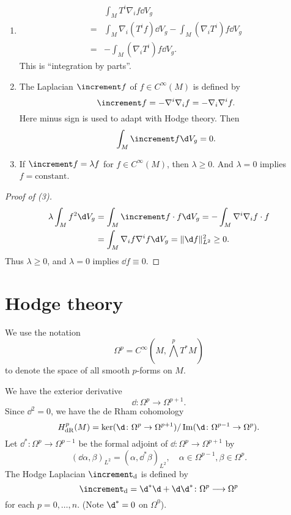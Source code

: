 \documentclass[12pt]{article}
\begin{document}
\begin{application}\hfill
\begin{enumerate}[(1)]
\item \begin{align*}
    &\int_{M}T^i \nabla_i f\dd{V_g} \\
    =&\int_{M}\nabla_i (T^i f)\dd{V_g}-\int_{M}(\nabla_i T^i)f\dd{V_g} \\
    =&-\int_{M}(\nabla_i T^i)f \dd{V_g}
  .\end{align*}
  This is ``integration by parts''.
\item The Laplacian \(\lap f\) of \(f\in C^\infty(M)\) is defined by \[
    \lap  f=-\nabla^i \nabla_i f=-\nabla_i \nabla^i f
  .\] Here minus sign is used to adapt with Hodge theory. Then \[
    \int_{M}\lap f \dd{V_g}=0
  .\] 
\item If \(\lap f=\lambda f\) for \(f\in C^\infty(M)\), then \(\lambda\ge 0\). And
  \(\lambda=0\) implies \(f=\text{constant}\).
\end{enumerate}
\end{application}
\begin{proof}[Proof of (3)]
  \begin{align*}
    \lambda\int_{M}f^2\dd{V_g}&=\int_{M}\lap f\cdot f\dd{V_g}
    =-\int_{M}\nabla^i \nabla_i f\cdot f \\
    &=\int_{M}\nabla_i f \nabla^i f\dd{V_g}=\|\dd{f}\|_{L^2}^2\ge 0
  .\end{align*}
  Thus \(\lambda\ge 0\), and \(\lambda=0\) implies \(\dd{f}\equiv 0\).
\end{proof}

\section{Hodge theory}
We use the notation \[
  \Omega^p=C^\infty(M,\bigwedge^p T^*M)
\] to denote the space of all smooth \(p\)-forms on \(M\).

We have the exterior derivative \[
  \dd\colon \Omega^p\longrightarrow \Omega^{p+1}
.\] Since \(\dd^2=0\), we have the de Rham cohomology \[
  H_{\mathrm{dR}}^p(M)=\ker(\dd\colon\Omega^p\to \Omega^{p+1})/\img(\dd\colon
  \Omega^{p-1}\to \Omega^p)
.\] Let \(\dd^*\colon \Omega^p\to \Omega^{p-1}\) be the formal adjoint of
\(\dd\colon \Omega^p\to\Omega^{p+1}\) by \[
  (\dd{\alpha},\beta)_{L^2}=(\alpha,\dd^*\beta)_{L^2},\quad
  \alpha\in \Omega^{p-1},\beta\in \Omega^p
.\] The Hodge Laplacian \(\lap_{\mathrm{d}}\) is defined by \[
  \lap_{\mathrm{d}}=\dd^*\dd+\dd \dd^*\colon \Omega^p\longrightarrow\Omega^p
\] for each \(p=0,\ldots,n\). (Note \(\d^*=0\) on \(\Omega^0\)).
\end{document}
